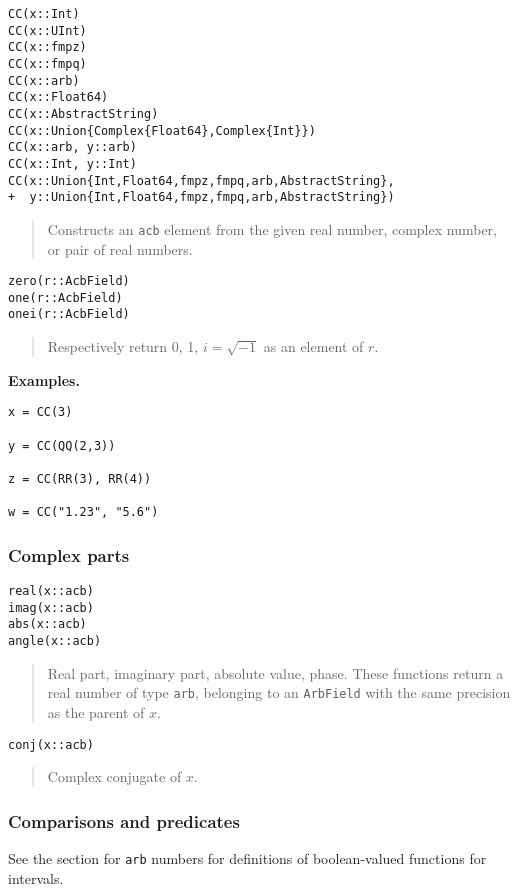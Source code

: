 \documentclass[a4paper,10pt]{article}
\newcommand{\code}{\lstinline}
\newcommand{\desc}[1]{\vspace{-3mm}\begin{quote}#1\end{quote}}
\begin{document}
{{\begin{lstlisting}
CC(x::Int)
CC(x::UInt)
CC(x::fmpz)
CC(x::fmpq)
CC(x::arb)
CC(x::Float64)
CC(x::AbstractString)
CC(x::Union{Complex{Float64},Complex{Int}})
CC(x::arb, y::arb)
CC(x::Int, y::Int)
CC(x::Union{Int,Float64,fmpz,fmpq,arb,AbstractString},
+  y::Union{Int,Float64,fmpz,fmpq,arb,AbstractString})
\end{lstlisting}


\desc{Constructs an \code{acb} element from the given real number,
complex number, or pair of real numbers.}

\begin{lstlisting}
zero(r::AcbField)
one(r::AcbField)
onei(r::AcbField)
\end{lstlisting}

\desc{Respectively return 0, 1, $i = \sqrt{-1}$ as an element of $r$.}

\textbf{Examples.}

\begin{lstlisting}
x = CC(3)

y = CC(QQ(2,3))

z = CC(RR(3), RR(4))

w = CC("1.23", "5.6")
\end{lstlisting}

\subsubsection{Complex parts}

\begin{lstlisting}
real(x::acb)
imag(x::acb)
abs(x::acb)
angle(x::acb)
\end{lstlisting}

\desc{Real part, imaginary part, absolute value, phase. These functions
return a real number of type \code{arb}, belonging to an \code{ArbField}
with the same precision as the parent of $x$.}

\begin{lstlisting}
conj(x::acb)
\end{lstlisting}

\desc{Complex conjugate of $x$.}

\subsubsection{Comparisons and predicates}

See the section for \code{arb} numbers for definitions of boolean-valued
functions for intervals.

}}
\end{document}
